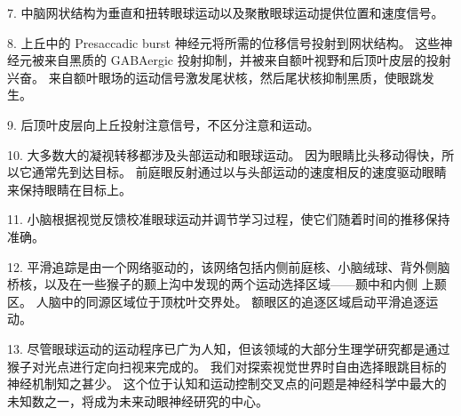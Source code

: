 7. 中脑网状结构为垂直和扭转眼球运动以及聚散眼球运动提供位置和速度信号。

8. 上丘中的 Presaccadic burst 神经元将所需的位移信号投射到网状结构。 这些神经元被来自黑质的 GABAergic 投射抑制，并被来自额叶视野和后顶叶皮层的投射兴奋。 来自额叶眼场的运动信号激发尾状核，然后尾状核抑制黑质，使眼跳发生。

9. 后顶叶皮层向上丘投射注意信号，不区分注意和运动。

10. 大多数大的凝视转移都涉及头部运动和眼球运动。 因为眼睛比头移动得快，所以它通常先到达目标。 前庭眼反射通过以与头部运动的速度相反的速度驱动眼睛来保持眼睛在目标上。

11. 小脑根据视觉反馈校准眼球运动并调节学习过程，使它们随着时间的推移保持准确。

12. 平滑追踪是由一个网络驱动的，该网络包括内侧前庭核、小脑绒球、背外侧脑桥核，以及在一些猴子的颞上沟中发现的两个运动选择区域——颞中和内侧 上颞区。 人脑中的同源区域位于顶枕叶交界处。 额眼区的追逐区域启动平滑追逐运动。

13. 尽管眼球运动的运动程序已广为人知，但该领域的大部分生理学研究都是通过猴子对光点进行定向扫视来完成的。 我们对探索视觉世界时自由选择眼跳目标的神经机制知之甚少。 这个位于认知和运动控制交叉点的问题是神经科学中最大的未知数之一，将成为未来动眼神经研究的中心。




